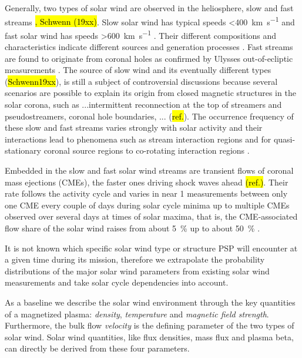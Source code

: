 Generally, two types of solar wind are observed in the heliosphere, slow and fast streams \citep{Neugebauer1966}\hl{, Schwenn (19xx)}. Slow solar wind has typical speeds \SI{<400}{\km\per\s} and fast solar wind has speeds \SI{>600}{\km\per\s} \citep[p.~144]{Schwenn1990}. Their different compositions and characteristics indicate different sources and generation processes \citep{McGregor2011a}. Fast streams are found to originate from coronal holes as confirmed by Ulysses out-of-ecliptic measurements \citep{McComas1998}. The source of slow wind and its eventually different types (\hl{Schwenn19xx}), is still a subject of controversial discussions because several scenarios are possible to explain its origin from closed magnetic structures in the solar corona, {\color{red} such as ...intermittent reconnection at the top of streamers and pseudostreamers, coronal hole boundaries, ... (\hl{ref.}).} The occurrence frequency of these slow and fast streams varies strongly with solar activity and their interactions lead to phenomena such as stream interaction regions and for quasi-stationary coronal source regions to co-rotating interaction regions \citep{Balogh1999}.

Embedded in the slow and fast solar wind streams are transient flows of coronal mass ejections (CMEs), the faster ones driving shock waves ahead \hl{(ref.)}. Their rate follows the activity cycle and varies in near \SI{1}{\au} measurements between only one CME every couple of days during solar cycle minima up to multiple CMEs observed over several days at times of solar maxima, that is, the CME-associated flow share of the solar wind raises from about \SI{5}{\percent} up to about \SI{50}{\percent} \citep{Richardson2012}.

It is not known which specific solar wind type or structure PSP will encounter at a given time during its mission, therefore we extrapolate the probability distributions of the major solar wind parameters from existing solar wind measurements and take solar cycle dependencies into account.

As a baseline we describe the solar wind environment through the key quantities of a magnetized plasma: \textit{density}, \textit{temperature} and \textit{magnetic field strength}. Furthermore, the bulk flow \textit{velocity} is the defining parameter of the two types of solar wind. Solar wind quantities, like flux densities, mass flux and plasma beta, can directly be derived from these four parameters.

